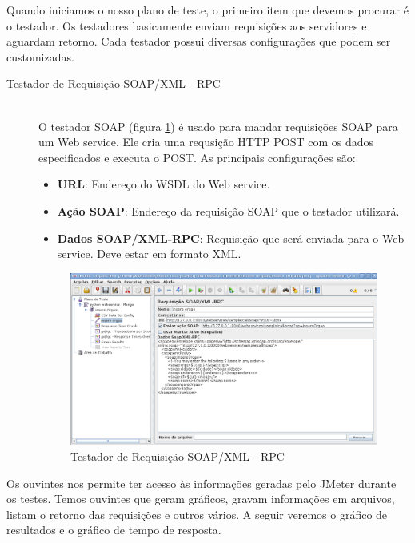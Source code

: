 Quando iniciamos o nosso plano de teste, o primeiro item que devemos procurar é o testador. Os testadores basicamente enviam requisições aos servidores e aguardam retorno. Cada testador possui diversas configurações que podem ser customizadas.

\begin{description}
\item[ Testador de Requisição SOAP/XML - RPC] \hfill \\

O testador SOAP (figura \ref{fig:testador_insere_orgao}) é usado para mandar requisições SOAP para um Web service.  Ele cria uma requsição HTTP POST com os dados especificados e executa o POST.  As principais configurações são:


\begin{itemize}
\item \textbf{URL}:  Endereço do WSDL do Web service.
\item \textbf{Ação SOAP}: Endereço da requisição SOAP que o testador utilizará.
\item \textbf{Dados SOAP/XML-RPC}: Requisição que será enviada para o Web service. Deve estar em formato XML.
\end{itemize}

	\begin{figure}[!htbp]
		\begin{center}
			\includegraphics[width=1\textwidth]{testador_insere_orgao}
		\end{center}
		\caption{Testador de Requisição SOAP/XML - RPC}
		\label{fig:testador_insere_orgao}
	\end{figure}
	
\end{description}

Os ouvintes nos permite ter acesso às informações geradas pelo JMeter durante os testes. Temos ouvintes que geram gráficos, gravam informações em arquivos, listam o retorno das requisições e outros vários. A seguir veremos o gráfico de resultados e o gráfico de tempo de resposta.

